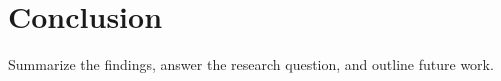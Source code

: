 \chapter{Conclusion}
\label{chap:conclusion}

Summarize the findings, answer the research question, and outline future work.
